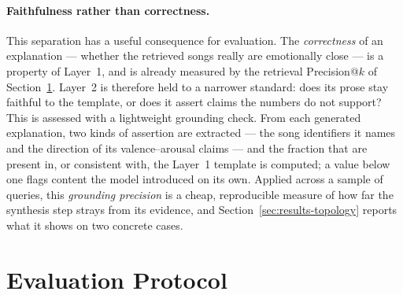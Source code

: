 \documentclass[12pt]{report}
\begin{document}
\paragraph{Faithfulness rather than correctness.} This separation has a useful consequence for evaluation. The \emph{correctness} of an explanation --- whether the retrieved songs really are emotionally close --- is a property of Layer~1, and is already measured by the retrieval Precision@$k$ of Section~\ref{sec:protocol}. Layer~2 is therefore held to a narrower standard: does its prose stay faithful to the template, or does it assert claims the numbers do not support? This is assessed with a lightweight grounding check. From each generated explanation, two kinds of assertion are extracted --- the song identifiers it names and the direction of its valence--arousal claims --- and the fraction that are present in, or consistent with, the Layer~1 template is computed; a value below one flags content the model introduced on its own. Applied across a sample of queries, this \emph{grounding precision} is a cheap, reproducible measure of how far the synthesis step strays from its evidence, and Section~\ref{sec:results-topology} reports what it shows on two concrete cases.

\section{Evaluation Protocol}
\label{sec:protocol}
\end{document}
